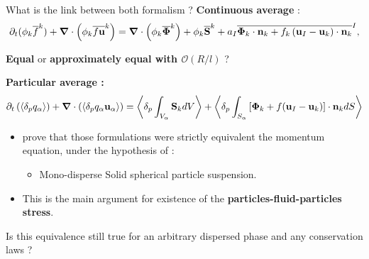 \documentclass{sintefbeamer}
\newcommand{\nablab}{\bm{\nabla}}
\begin{document}
\begin{frame}{What is the link between both formalism ?}
  \textbf{Continuous average} :
  \begin{equation*}
      \pddt (\phi_k\kavg{f})
      + \nablab \cdot \left(
          \phi_k \kavg{f \textbf{u}}
      \right)
      = \nablab \cdot \left(
          \phi_k \kavg{\bm{\Phi}}
      \right)
      + \phi_k \kavg{\textbf{S}}
      + a_I \Iavg{
          \bm{\Phi}_k \cdot \textbf{n}_k
          + f_k 
          \left(
              \textbf{u}_I
              - \textbf{u}_k
          \right) \cdot \textbf{n}_k
      },
      \label{eq:avg_k_global}
  \end{equation*}
  \begin{center}
    \color{red}
    \textbf{Equal }
    or 
    \textbf{approximately equal with $\mathcal{O}(R/l)$} ?
  \end{center}
  \textbf{Particular average :}
  \begin{equation*}
    \pddt   \left(\pavg{q_\alpha}\right)
    + \nablab \cdot \left(\pavg{q_\alpha \textbf{u}_\alpha}\right) 
    = \pavg{\int_{V_\alpha} \textbf{S}_k dV}
    + \pavg{\int_{S_\alpha} \left[\bm{\Phi}_k + f (\textbf{u}_I-\textbf{u}_k) \right] \cdot \textbf{n}_k d S}
\end{equation*}
\begin{itemize}
  \item \citet{nott2011suspension} prove that those formulations were strictly equivalent the momentum equation, under the hypothesis of :
  \begin{itemize}
    \item Mono-disperse Solid spherical particle suspension.
  \end{itemize}
  \item This is the main argument for existence of the \textbf{particles-fluid-particles stress}.
\end{itemize}

Is this equivalence still true for an arbitrary dispersed phase and any conservation laws ?
\end{frame}
\end{document}

